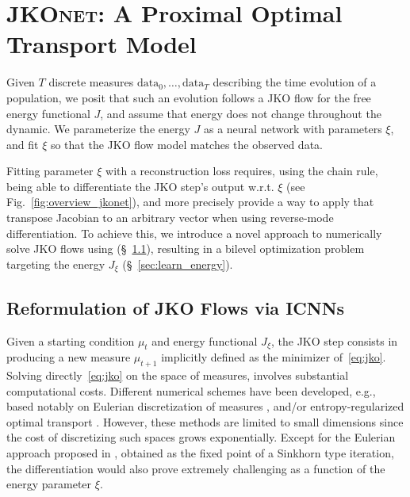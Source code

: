 \section{\textsc{JKOnet}: A Proximal Optimal Transport Model} 

Given $T$ discrete measures $\mathrm{data}_0, \dots, \mathrm{data}_T$ describing the time evolution of a population, we posit that such an evolution follows a \acrshort{JKO} flow for the free energy functional $J$, and assume that energy does not change throughout the dynamic. We parameterize the energy $J$ as a neural network with parameters $\xi$, and fit $\xi$ so that the \acrshort{JKO} flow model matches the observed data. 

Fitting parameter $\xi$ with a reconstruction loss requires, using the chain rule, being able to differentiate the \acrshort{JKO} step's output w.r.t. $\xi$ (see Fig.~\ref{fig:overview_jkonet}), and more precisely provide a way to apply that transpose Jacobian to an arbitrary vector when using reverse-mode differentiation. To achieve this, we introduce a novel approach to numerically solve \acrshort{JKO} flows using  (\S~\ref{sec:jko_icnn}), resulting in a bilevel optimization problem targeting the energy $J_\xi$ (\S~\ref{sec:learn_energy}).

\subsection{Reformulation of JKO Flows via ICNNs} \label{sec:jko_icnn}
Given a starting condition $\mu_t$ and energy functional $J_\xi$, the \acrshort{JKO} step consists in producing a new measure $\mu_{t+1}$ implicitly defined as the minimizer of~\eqref{eq:jko}. Solving directly~\eqref{eq:jko} on the space of measures, involves substantial computational costs. Different numerical schemes have been developed, e.g., based notably on Eulerian discretization of measures \citep{carrillo2021primal, benamou2016discretization}, and/or entropy-regularized optimal transport \citep{peyre2015entropic}. However, these methods are limited to small dimensions since the cost of discretizing such spaces grows exponentially. Except for the Eulerian approach proposed in \citep{peyre2015entropic}, obtained as the fixed point of a Sinkhorn type iteration, the differentiation would also prove extremely challenging as a function of the energy parameter $\xi$.

